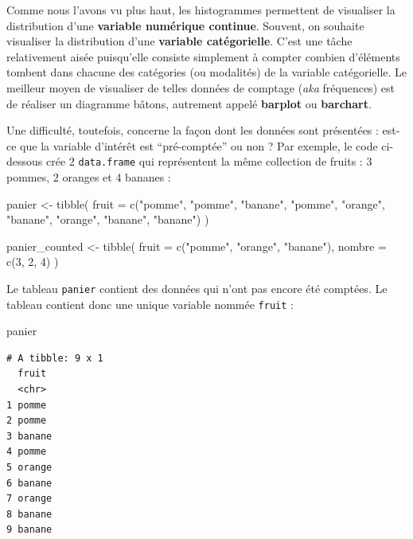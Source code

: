 \documentclass[
  a4paper,
  DIV=11,
  numbers=noendperiod,
  oneside]{scrreprt}
\newenvironment{Shaded}{}{}
\newcommand{\AttributeTok}[1]{\textcolor[rgb]{0.84,0.23,0.29}{#1}}
\newcommand{\DecValTok}[1]{\textcolor[rgb]{0.00,0.36,0.77}{#1}}
\newcommand{\FunctionTok}[1]{\textcolor[rgb]{0.44,0.26,0.76}{#1}}
\newcommand{\NormalTok}[1]{\textcolor[rgb]{0.14,0.16,0.18}{#1}}
\newcommand{\OtherTok}[1]{\textcolor[rgb]{0.44,0.26,0.76}{#1}}
\newcommand{\StringTok}[1]{\textcolor[rgb]{0.01,0.18,0.38}{#1}}
\begin{document}
Comme nous l'avons vu plus haut, les histogrammes permettent de
visualiser la distribution d'une \textbf{variable numérique continue}.
Souvent, on souhaite visualiser la distribution d'une \textbf{variable
catégorielle}. C'est une tâche relativement aisée puisqu'elle consiste
simplement à compter combien d'éléments tombent dans chacune des
catégories (ou modalités) de la variable catégorielle. Le meilleur moyen
de visualiser de telles données de comptage (\emph{aka} fréquences) est
de réaliser un diagramme bâtons, autrement appelé \textbf{barplot} ou
\textbf{barchart}.

Une difficulté, toutefois, concerne la façon dont les données sont
présentées : est-ce que la variable d'intérêt est ``pré-comptée'' ou non
? Par exemple, le code ci-dessous crée 2 \texttt{data.frame} qui
représentent la même collection de fruits : 3 pommes, 2 oranges et 4
bananes :

\begin{Shaded}
\begin{Highlighting}[]
\NormalTok{panier }\OtherTok{\textless{}{-}} \FunctionTok{tibble}\NormalTok{(}
  \AttributeTok{fruit =} \FunctionTok{c}\NormalTok{(}\StringTok{"pomme"}\NormalTok{, }\StringTok{"pomme"}\NormalTok{, }\StringTok{"banane"}\NormalTok{, }\StringTok{"pomme"}\NormalTok{, }\StringTok{"orange"}\NormalTok{, }\StringTok{"banane"}\NormalTok{, }\StringTok{"orange"}\NormalTok{, }\StringTok{"banane"}\NormalTok{, }\StringTok{"banane"}\NormalTok{)}
\NormalTok{)}

\NormalTok{panier\_counted }\OtherTok{\textless{}{-}} \FunctionTok{tibble}\NormalTok{(}
  \AttributeTok{fruit =} \FunctionTok{c}\NormalTok{(}\StringTok{"pomme"}\NormalTok{, }\StringTok{"orange"}\NormalTok{, }\StringTok{"banane"}\NormalTok{),}
  \AttributeTok{nombre =} \FunctionTok{c}\NormalTok{(}\DecValTok{3}\NormalTok{, }\DecValTok{2}\NormalTok{, }\DecValTok{4}\NormalTok{)}
\NormalTok{)}
\end{Highlighting}
\end{Shaded}

Le tableau \texttt{panier} contient des données qui n'ont pas encore été
comptées. Le tableau contient donc une unique variable nommée
\texttt{fruit} :

\begin{Shaded}
\begin{Highlighting}[]
\NormalTok{panier}
\end{Highlighting}
\end{Shaded}

\begin{verbatim}
# A tibble: 9 x 1
  fruit 
  <chr> 
1 pomme 
2 pomme 
3 banane
4 pomme 
5 orange
6 banane
7 orange
8 banane
9 banane
\end{verbatim}
\end{document}
